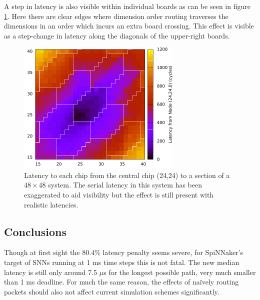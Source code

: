 				A step in latency is also visible within individual boards as can be
				seen in figure \ref{fig:packet-latency-closeup-exaggerated}. Here there
				are clear edges where dimension order routing traverses the dimensions
				in an order which incurs an extra board crossing. This effect is visible
				as a step-change in latency along the diagonals of the upper-right
				boards.
		
				\begin{figure}
					\center
					\includegraphics[width=0.7\textwidth]{figures/packet-latency-closeup-exaggerated.pdf}
					
					\caption[Latency to a subset of chips with exaggerated board-to-board
					latency.]{Latency to each chip from the central chip (24,24) to a
					section of a $48\times{}48$ system. The serial latency in this system
					has been exaggerated to aid visibility but the effect is still present
					with realistic latencies.}
					
					\label{fig:packet-latency-closeup-exaggerated}
				\end{figure}
		
		\subsection{Conclusions}
			
			Though at first sight the 80.4\% latency penalty seems severe, for
			SpiNNaker's target of SNNs running at 1 ms time steps this is not fatal.
			The new median latency is still only around 7.5 $\mu$s for the longest
			possible path, very much smaller than 1 ms deadline.  For much the same
			reason, the effects of na\"ively routing packets should also not affect
			current simulation schemes significantly.
			
			
